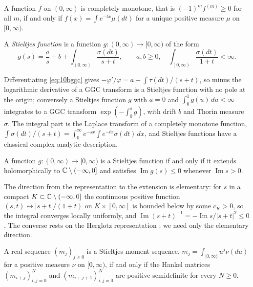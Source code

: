 \begin{theorem}[Bernstein]\label{thm:10bbernstein}
A function $f$ on $(0,\infty)$ is completely monotone, that is $(-1)^mf^{(m)}\ge0$ for all $m$, if and only if $f(x) = \int e^{-tx}\mu(dt)$ for a unique positive measure $\mu$ on $[0,\infty)$.
\end{theorem}

\begin{definition}\label{def:10bstieltjes}
A \emph{Stieltjes function} is a function $g:(0,\infty)\to[0,\infty)$ of the form
\[
g(s) = \frac as + b + \int_{(0,\infty)}\frac{\sigma(dt)}{s+t},\qquad a,b\ge0,\quad \int_{(0,\infty)}\frac{\sigma(dt)}{1+t}<\infty .
\]
\end{definition}

Differentiating \eqref{eq:10bggc} gives $-\varphi'/\varphi = a+\int\tau(dt)/(s+t)$, so minus the logarithmic derivative of a GGC transform is a Stieltjes function with no pole at the origin; conversely a Stieltjes function $g$ with $a=0$ and $\int_0^1g(u)\,du<\infty$ integrates to a GGC transform $\exp(-\int_0^sg)$, with drift $b$ and Thorin measure $\sigma$. The integral part is the Laplace transform of a completely monotone function, $\int\sigma(dt)/(s+t) = \int_0^\infty e^{-sx}\int e^{-tx}\sigma(dt)\,dx$, and Stieltjes functions have a classical complex analytic description.

\begin{theorem}\label{thm:10bpick}
A function $g:(0,\infty)\to[0,\infty)$ is a Stieltjes function if and only if it extends holomorphically to $\mathbb{C}\setminus(-\infty,0]$ and satisfies $\operatorname{Im}g(s)\le0$ whenever $\operatorname{Im}s>0$.
\end{theorem}

The direction from the representation to the extension is elementary: for $s$ in a compact $K\subset\mathbb{C}\setminus(-\infty,0]$ the continuous positive function $(s,t)\mapsto|s+t|/(1+t)$ on $K\times[0,\infty]$ is bounded below by some $c_K>0$, so the integral converges locally uniformly, and $\operatorname{Im}(s+t)^{-1} = -\operatorname{Im}s/|s+t|^2\le0$. The converse rests on the Herglotz representation \cite{schillingsongvondracek2012}; we need only the elementary direction.

\begin{theorem}[Stieltjes]\label{thm:10bstieltjesmoment}
A real sequence $(m_j)_{j\ge0}$ is a Stieltjes moment sequence, $m_j = \int_{[0,\infty)}u^j\nu(du)$ for a positive measure $\nu$ on $[0,\infty)$, if and only if the Hankel matrices $(m_{i+j})_{i,j=0}^N$ and $(m_{i+j+1})_{i,j=0}^N$ are positive semidefinite for every $N\ge0$.
\end{theorem}

